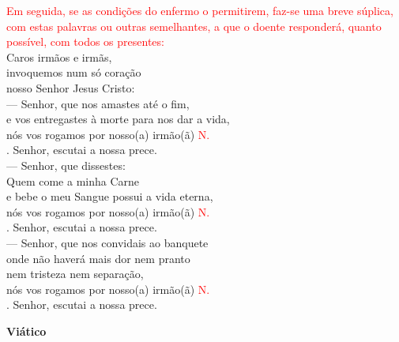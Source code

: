 \documentclass{book}
\begin{document}
\begin{flushleft}
    \textcolor{red}{Em seguida, se as condições do enfermo o permitirem, faz-se uma breve súplica, com estas palavras ou outras semelhantes, a que o doente responderá, quanto possível, com todos os presentes:}
    \vspace{.1cm} \\
    Caros irmãos e irmãs, \\
    invoquemos num só coração \\
    nosso Senhor Jesus Cristo:
    \vspace{.1cm} \\
    --- Senhor, que nos amastes até o fim, \\
    e vos entregastes à morte para nos dar a vida, \\
    nós vos rogamos por nosso(a) irmão(ã) \textcolor{red}{N.}
    \vspace{.1cm} \\
    {\color{red} \Rbar.} Senhor, escutai a nossa prece.
    \vspace{.1cm} \\
    --- Senhor, que dissestes: \\
    Quem come a minha Carne \\
    e bebe o meu Sangue possui a vida eterna, \\
    nós vos rogamos por nosso(a) irmão(ã) \textcolor{red}{N.}
    \vspace{.1cm} \\
    {\color{red} \Rbar.} Senhor, escutai a nossa prece.
    \vspace{.1cm} \\
    --- Senhor, que nos convidais ao banquete \\
    onde não haverá mais dor nem pranto \\
    nem tristeza nem separação, \\
    nós vos rogamos por nosso(a) irmão(ã) \textcolor{red}{N.}
    \vspace{.1cm} \\
    {\color{red} \Rbar.} Senhor, escutai a nossa prece.
    \vspace{.1cm} \\
\end{flushleft}
\begin{center}
    \textbf{Viático}
\end{center}
\end{document}
